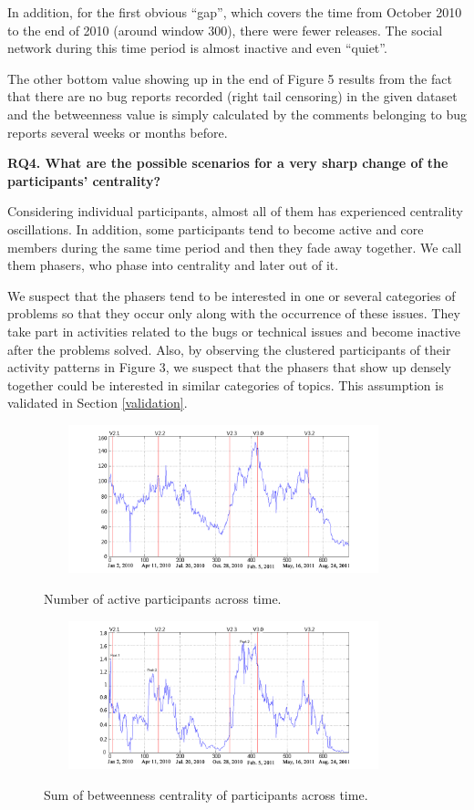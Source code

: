 \documentclass[10pt, conference, compsocconf]{IEEEtran}
\begin{document}
In addition, for the first obvious ``gap'', which covers the time from
October 2010 to the end of 2010 (around window 300), there were fewer
releases. The social network during this time period is almost inactive
and even ``quiet''.


The other bottom value showing up in the end of Figure 5 results from
the fact that there are no bug reports recorded (right tail censoring) in the given dataset
and the betweenness value is simply calculated by the comments
belonging to bug reports several weeks or months before. 


\textbf{RQ4. What are the possible scenarios for a very sharp change of the participants' centrality?}

Considering individual participants, almost all of them has
experienced centrality oscillations. In addition, some participants
tend to become active and core members during the same time
period and then they fade away together. We call them phasers, who
phase into centrality and later out of it.


We suspect that the phasers tend to be interested in one or several
categories of problems so that they occur only along with the
occurrence of these issues. They take part in activities related to
the bugs or technical issues and become inactive after the problems
solved. Also, by observing the clustered participants of their
activity patterns in Figure 3, we suspect that the phasers that show
up densely together could be interested in similar categories of
topics. This assumption is validated in Section
\ref{validation}. 


\begin{figure}[!t]
\centerline{\includegraphics[width=4.1in, height = 4.3cm]{people.png}
\label{people}}
\caption{Number of active participants across time.}
\end{figure}

\begin{figure}[!t]
\centerline{\includegraphics[width=4.1in, height = 4.3cm]{betweenness.png}
\label{betweenness}}
\caption{Sum of betweenness centrality of participants across time.}
\end{figure}
\end{document}
